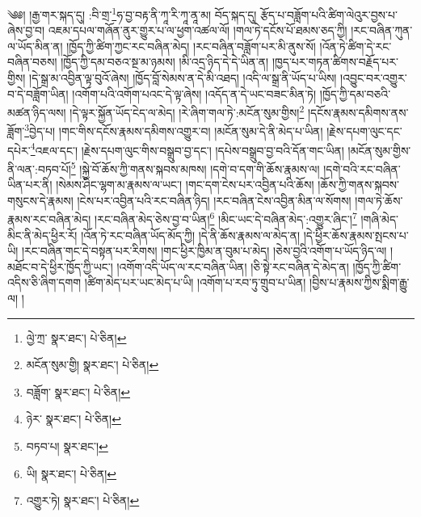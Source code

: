 \setcounter{footnote}{0} 
 ༄༅། །རྒྱ་གར་སྐད་དུ། :བི་གྲ་\footnote{ལྱེ་ཀྲ་  སྣར་ཐང་།  པེ་ཅིན། }ཧ་བྱ་བརྟ་ནི་ཀཱ་རི་ཀཱ་ནཱ་མ། བོད་སྐད་དུ། རྩོད་པ་བཟློག་པའི་ཚིག་ལེའུར་བྱས་པ་ཞེས་བྱ་བ། འཇམ་དཔལ་གཞོན་ནུར་གྱུར་པ་ལ་ཕྱག་འཚལ་ལོ། །གལ་ཏེ་དངོས་པོ་ཐམས་ཅད་ཀྱི། །རང་བཞིན་ཀུན་ལ་ཡོད་མིན་ན། །ཁྱོད་ཀྱི་ཚིག་ཀྱང་རང་བཞིན་མེད། །རང་བཞིན་བཟློག་པར་མི་ནུས་སོ། །འོན་ཏེ་ཚིག་དེ་རང་བཞིན་བཅས། །ཁྱོད་ཀྱི་དམ་བཅའ་སྔ་མ་ཉམས། །མི་འདྲ་ཉིད་དེ་དེ་ཡིན་ན། །ཁྱད་པར་གཏན་ཚིགས་བརྗོད་པར་གྱིས། །དེ་སྒྲ་མ་འབྱིན་ལྟ་བུའོ་ཞེས། །ཁྱོད་བློ་སེམས་ན་དེ་མི་འཐད། །འདི་ལ་སྒྲ་ནི་ཡོད་པ་ཡིས། །འབྱུང་བར་འགྱུར་བ་དེ་བཟློག་ཡིན། །འགོག་པའི་འགོག་པའང་དེ་ལྟ་ཞེས། །འདོད་ན་དེ་ཡང་བཟང་མིན་ཏེ། །ཁྱོད་ཀྱི་དམ་བཅའི་མཚན་ཉིད་ལས། །དེ་ལྟར་སྐྱོན་ཡོད་ངེད་ལ་མེད། །རེ་ཞིག་གལ་ཏེ་:མངོན་སུམ་གྱིས།\footnote{མངོན་སུམ་གྱི།  སྣར་ཐང་།  པེ་ཅིན། } །དངོས་རྣམས་དམིགས་ནས་ཟློག་\footnote{བཟློག་  སྣར་ཐང་།  པེ་ཅིན། }བྱེད་པ། །གང་གིས་དངོས་རྣམས་དམིགས་འགྱུར་བ། །མངོན་སུམ་དེ་ནི་མེད་པ་ཡིན། །རྗེས་དཔག་ལུང་དང་དཔེར་\footnote{ཉེར་  སྣར་ཐང་།  པེ་ཅིན། }འཇལ་དང་། །རྗེས་དཔག་ལུང་གིས་བསྒྲུབ་བྱ་དང་། །དཔེས་བསྒྲུབ་བྱ་བའི་དོན་གང་ཡིན། །མངོན་སུམ་གྱིས་ནི་ལན་:བཏབ་པོ།\footnote{བཏབ་པ།  སྣར་ཐང་། } །སྐྱེ་བོ་ཆོས་ཀྱི་གནས་སྐབས་མཁས། །དགེ་བ་དག་གི་ཆོས་རྣམས་ལ། །དགེ་བའི་རང་བཞིན་ཡིན་པར་ནི། །སེམས་ཤིང་ལྷག་མ་རྣམས་ལ་ཡང་། །གང་དག་ངེས་པར་འབྱིན་པའི་ཆོས། །ཆོས་ཀྱི་གནས་སྐབས་གསུངས་དེ་རྣམས། །ངེས་པར་འབྱིན་པའི་རང་བཞིན་ཉིད། །རང་བཞིན་ངེས་འབྱིན་མིན་ལ་སོགས། །གལ་ཏེ་ཆོས་རྣམས་རང་བཞིན་མེད། །རང་བཞིན་མེད་ཅེས་བྱ་བ་ཡིན།\footnote{ཡི།  སྣར་ཐང་།  པེ་ཅིན། } །མིང་ཡང་དེ་བཞིན་མེད་:འགྱུར་ཞིང་།\footnote{འགྱུར་ཏེ།  སྣར་ཐང་།  པེ་ཅིན། } །གཞི་མེད་མིང་ནི་མེད་ཕྱིར་རོ། །འོན་ཏེ་རང་བཞིན་ཡོད་མོད་ཀྱི། །དེ་ནི་ཆོས་རྣམས་ལ་མེད་ན། །དེ་ཕྱིར་ཆོས་རྣམས་སྤངས་པ་ཡི། །རང་བཞིན་གང་དེ་བསྟན་པར་རིགས། །གང་ཕྱིར་ཁྱིམ་ན་བུམ་པ་མེད། །ཅེས་བྱའི་འགོག་པ་ཡོད་ཉིད་ལ། །མཐོང་བ་དེ་ཕྱིར་ཁྱོད་ཀྱི་ཡང་། །འགོག་འདི་ཡོད་ལ་རང་བཞིན་ཡིན། །ཅི་སྟེ་རང་བཞིན་དེ་མེད་ན། །ཁྱོད་ཀྱི་ཚིག་འདིས་ཅི་ཞིག་དགག །ཚིག་མེད་པར་ཡང་མེད་པ་ཡི། །འགོག་པ་རབ་ཏུ་གྲུབ་པ་ཡིན། །བྱིས་པ་རྣམས་ཀྱིས་སྨིག་རྒྱུ་ལ། །
